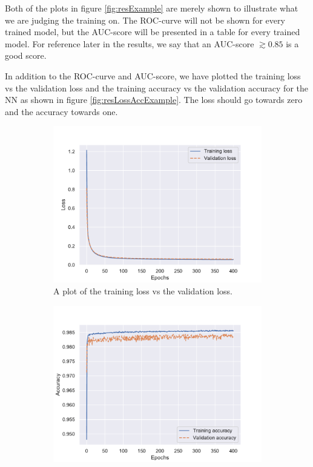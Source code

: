 Both of the plots in figure \ref{fig:resExample} are merely shown to illustrate what we are judging the training on. The ROC-curve will not be shown for every trained model, but the AUC-score will be presented in a table for every trained model. For reference later in the results, we say that an AUC-score $\gtrsim 0.85$ is a good score.

In addition to the ROC-curve and AUC-score, we have plotted the training loss vs the validation loss and the training accuracy vs the validation accuracy for the NN as shown in figure \ref{fig:resLossAccExample}. The loss should go towards zero and the accuracy towards one. 

\begin{figure}[H]
    \centering
    \begin{subfigure}[t!]{0.49\textwidth}
        \includegraphics[width = \textwidth]{Figures/SlepSlep/ML/NN/High_level/Inter/Loss_sig_slepslep_high_level_high.pdf}
        \caption{A plot of the training loss vs the validation loss.}
        \label{fig:LossExample}
    \end{subfigure}
    \begin{subfigure}[t!]{0.49\textwidth}
        \includegraphics[width = \textwidth]{Figures/SlepSlep/ML/NN/High_level/Inter/Accuracy_sig_slepslep_high_level_high.pdf}

\end{subfigure}
\end{figure}
